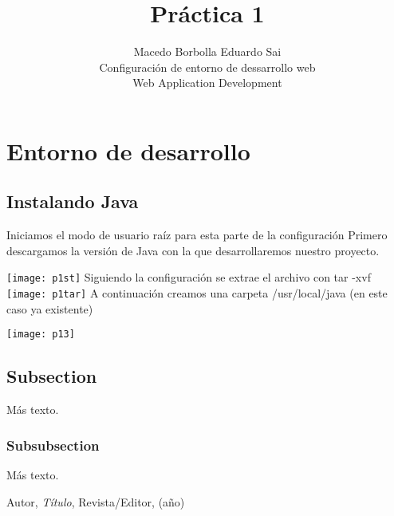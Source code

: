 \documentclass{article}
\title{Práctica 1}
\author{Macedo Borbolla Eduardo Sai\\
  \small Configuración de entorno de dessarrollo web\\
  \small Web Application Development\\
}
\theoremstyle{definition}
\theoremstyle{remark}
\begin{document}
\maketitle


\section{Entorno de desarrollo}

\subsection{Instalando Java}
Iniciamos el  modo  de usuario raíz para esta parte de la configuración
 \break Primero descargamos la versión de Java con la que desarrollaremos nuestro proyecto. \hfill
\break

\texttt{[image: p1st]}
\newline
Siguiendo la configuración se extrae el archivo con tar -xvf 
\hfill
\break
\texttt{[image: p1tar]}
\newpage
A continuación creamos una carpeta /usr/local/java (en este caso ya existente)

\texttt{[image: p13]}

\subsection{Subsection}\label{sec:nada}

Más texto.

\subsubsection{Subsubsection}\label{sec:nada2}

Más texto.

\begin{thebibliography}{99}

 Autor, \emph{Título}, Revista/Editor, (año)

\end{thebibliography}
\end{document}

